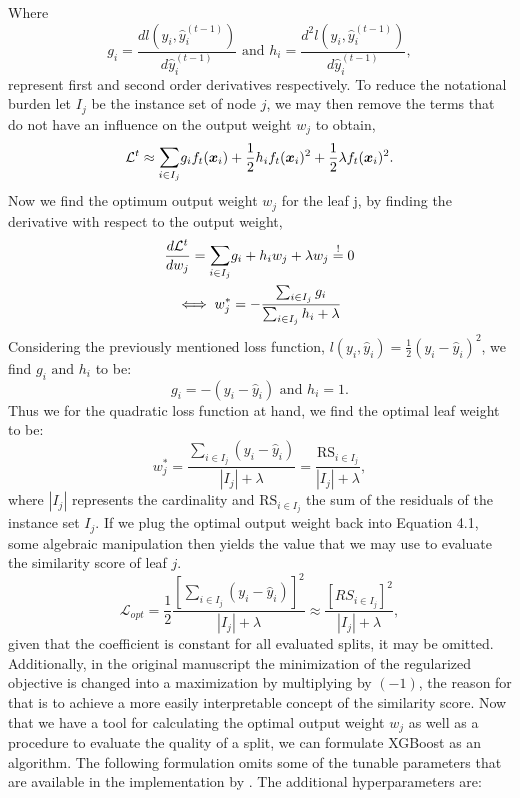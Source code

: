 \documentclass[a4paper,12pt, headsepline]{scrartcl}
\numberwithin{equation}{section}
\begin{document}
Where 
\[
g_i = \frac{d l(y_i, \hat y_i^{(t-1)})}{d \hat y_i^{(t-1)}} \text{ and } h_i = \frac{d^2 l(y_i, \hat y_i^{(t-1)})}{d \hat y_i^{(t-1)}},
\]
represent first and second order derivatives respectively. To reduce the notational burden let $I_j$ be the instance set of node $j$, we may then remove the terms that do not have an influence on the output weight $w_j$ to obtain, 
\begin{gather}
\mathcal{L}^t \approx \mathlarger{\sum}\limits_{i \in I_j} g_i f_t(\bm x_i) + \frac{1}{2}h_i f_t( \bm x_i)^2 + \frac{1}{2}\lambda f_t(\bm x_i)^2.
\end{gather}
Now we find the optimum output weight $w_j$ for the leaf j, by finding the derivative with respect to the output weight,
\begin{gather*}
\frac{d \mathcal{L}^t}{d w_j} =  \mathlarger{\sum}\limits_{i \in I_j} g_i + h_i w_j + \lambda w_j \overset{!}{=} 0 \\ \iff w^*_j = - \frac{\sum_{i \in I_j} g_i}{\sum_{i \in I_j} h_i + \lambda}
\end{gather*}
Considering the previously mentioned loss function, $l(y_i, \hat y_i) = \frac{1}{2} (y_i - \hat  y_i)^2$, we find $g_i \text{ and } h_i$ to be:
\[
g_i = -(y_i - \hat y_i)\text{ and } h_i = 1.
\]
Thus we for the quadratic loss function at hand, we find the optimal leaf weight to be:
\[
w^*_j =  \frac{\sum_{i \in I_j} (y_i - \hat  y_i)}{|I_j| + \lambda} = \frac{\text{RS}_{i \in I_j}}{|I_j| + \lambda},
\]
where $|I_j|$ represents the cardinality and $\text{RS}_{i \in I_j}$ the sum of the residuals of the instance set $I_j$. If we plug the optimal output weight back into Equation 4.1, some algebraic manipulation then yields the value that we may use to evaluate the similarity score of leaf $j$.
\[
\mathcal{L}_{opt} = \frac{1}{2}\frac{[\sum_{i \in I_j} (y_i - \hat  y_i)]^2}{|I_j| + \lambda} \approx \frac{[RS_{i \in I_j}]^2}{|I_j| + \lambda},
\]
given that the coefficient is constant for all evaluated splits, it may be omitted. Additionally, in the original manuscript the minimization of the regularized objective is changed into a maximization by multiplying by $(-1)$, the reason for that is to achieve a more easily interpretable concept of the similarity score. Now that we have a tool for calculating the optimal output weight $w_j$ as well as a procedure to evaluate the quality of a split, we can formulate XGBoost as an algorithm. The following formulation omits some of the tunable parameters that are available in the implementation by \citet{xgboost}. The additional hyperparameters are:
\end{document}
